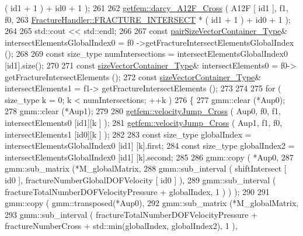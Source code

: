 \begin{DoxyCode}
       ( id1 + 1 ) + id0 + 1 );
261 
262         \hyperlink{namespacegetfem_a88df6c0cb0765d5ab0fae27679cd30f4}{getfem::darcy\_A12F\_Cross} ( A12F [ id1 ], f1, f0,
263                                    \hyperlink{classFractureHandler_a495ad4fc72d0c47c8f0424842f1153aaa781cae3f3b99bf9357fed2833d315537}{FractureHandler::FRACTURE\_INTERSECT} *
       ( id1 + 1 ) + id0 + 1 );
264 
265         std::cout << std::endl;
266         
267         \textcolor{keyword}{const} \hyperlink{Core_8h_a9bc476e433f99b82a9c2b8560735c7b5}{pairSizeVectorContainer\_Type}& intersectElementsGlobalIndex0 = f0
      ->getFractureIntersectElementsGlobalIndex ();
268         
269         \textcolor{keyword}{const} size\_type numIntersections = intersectElementsGlobalIndex0 [id1].size();
270         
271         \textcolor{keyword}{const} \hyperlink{Core_8h_a80e8381d86ecb0a7f4f87ff84d1a0be5}{sizeVectorContainer\_Type}& intersectElements0 = f0->
      getFractureIntersectElements ();
272         \textcolor{keyword}{const} \hyperlink{Core_8h_a80e8381d86ecb0a7f4f87ff84d1a0be5}{sizeVectorContainer\_Type}& intersectElements1 = f1->
      getFractureIntersectElements ();
273         
274         
275         \textcolor{keywordflow}{for} ( size\_type k = 0; k < numIntersections; ++k )
276         \{
277             gmm::clear (*Aup0);
278             gmm::clear (*Aup1);
279 
280             \hyperlink{namespacegetfem_acc74b86734c3814042e614d015f23876}{getfem::velocityJump\_Cross} ( Aup0, f0, f1, intersectElements0 [id1][k
      ] );
281             \hyperlink{namespacegetfem_acc74b86734c3814042e614d015f23876}{getfem::velocityJump\_Cross} ( Aup1, f1, f0, intersectElements1 [id0][k
      ] );
282 
283             \textcolor{keyword}{const} size\_type globalIndex = intersectElementsGlobalIndex0 [id1] [k].first;
284             \textcolor{keyword}{const} size\_type globalIndex2 = intersectElementsGlobalIndex0 [id1] [k].second;
285             
286             gmm::copy ( *Aup0, 
287                         gmm::sub\_matrix (*M\_globalMatrix,
288                                         gmm::sub\_interval ( shiftIntersect [ id0 ], 
      fractureNumberGlobalDOFVelocity [ id0 ] ),
289                                         gmm::sub\_interval (  fractureTotalNumberDOFVelocityPressure + 
      globalIndex, 1 ) ) );
290 
291             gmm::copy ( gmm::transposed(*Aup0), 
292                         gmm::sub\_matrix (*M\_globalMatrix,
293                                         gmm::sub\_interval (  fractureTotalNumberDOFVelocityPressure + 
      fractureNumberCross + std::min(globalIndex, globalIndex2), 1 ),

\end{DoxyCode}
